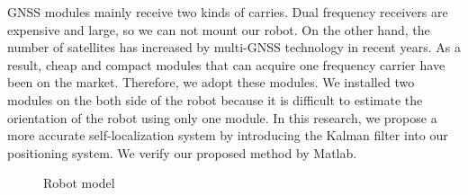 \documentclass[a4paper]{article}
\begin{document}
GNSS modules mainly receive two kinds of carries.
Dual frequency receivers are expensive and large, so we can not mount our robot.
On the other hand, the number of satellites has increased by multi-GNSS technology in recent years. 
As a result, cheap and compact modules that can acquire one frequency carrier have been on the market.
Therefore, we adopt these modules.
We installed two modules on the both side of the robot because it is difficult to estimate the orientation of the robot using only one module\cite{rtk-gnss}\cite{auto-weeding}.
In this research, we propose a more accurate self-localization system by introducing the Kalman filter into our positioning system.
We verify our proposed method by Matlab.

\begin{figure}[H]
    \vspace{5mm}
    \centerline{}
    \caption{Robot model}
\end{figure}
\end{document}
